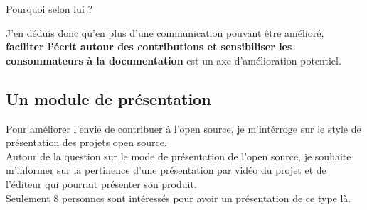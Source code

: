 			Pourquoi selon lui ?

			\begin{center}
				\textit{
				}
			\end{center}

			J'en déduis donc qu'en plus d'une communication pouvant être amélioré, \textbf{faciliter l'écrit autour des contributions et sensibiliser les consommateurs à la documentation} est un axe d'amélioration potentiel.

		\subsection{Un module de présentation}

			Pour améliorer l'envie de contribuer à l'open source, je m'intérroge sur le style de présentation des projets open source.\\
			Autour de la question sur le mode de présentation de l'open source, je souhaite m'informer sur la pertinence d'une présentation par vidéo du projet et de l'éditeur qui pourrait présenter son produit.\\
			Seulement 8 personnes sont intéressés pour avoir un présentation de ce type là.

